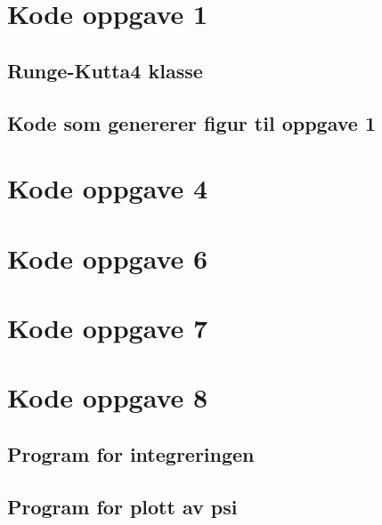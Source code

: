 \documentclass[norsk,a4paper,12pt]{article}
\begin{document}
\newpage
\begin{appendices}
\appendix
\section{Kode oppgave 1}
\subsection{Runge-Kutta4 klasse}

\subsection{Kode som genererer figur til oppgave 1}

\section{Kode oppgave 4}

\section{Kode oppgave 6}

\section{Kode oppgave 7}

\section{Kode oppgave 8}
\subsection{Program for integreringen}

\subsection{Program for plott av psi}




\end{appendices}
\end{document}
